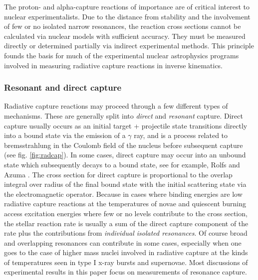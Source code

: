 The proton- and alpha-capture reactions of importance are of critical interest to nuclear experimentalists. Due to the distance from stability and the involvement of few or no isolated narrow resonances, the reaction cross sections cannot be calculated via nuclear models with sufficient accuracy. They must be measured directly or determined partially via indirect experimental methods. This principle founds the basis for much of the experimental nuclear astrophysics programs involved in measuring radiative capture reactions in inverse kinematics.   

\subsubsection{Resonant and direct capture}

Radiative capture reactions may proceed through a few different types of mechanisms. These are generally split into {\em direct} and {\em resonant} capture. Direct capture usually occurs as an initial target + projectile state transitions directly into a bound state via the emission of a $\gamma$ ray, and is a process related to bremsstrahlung in the Coulomb field of the nucleus before subsequent capture (see fig. \ref{fig:radcap}). In some cases, direct capture may occur into an unbound state which subsequently decays to a bound state, see for example, Rolfs and Azuma \cite{rolfs74}. The cross section for direct capture is proportional to the overlap integral over radius of the final bound state with the initial scattering state via the electromagnetic operator. Because in cases where binding energies are low radiative capture reactions at the temperatures of novae and quiescent burning access excitation energies where few or no levels contribute to the cross section, the stellar reaction rate is usually a sum of the direct capture component of the rate plus the contributions from  {\em individual isolated resonances}. Of course broad and overlapping resonances can contribute in some cases, especially when one goes to the case of higher mass nuclei involved in radiative capture at the kinds of temperatures seen in type I x-ray bursts and supernovae. Most discussions of experimental results in this paper focus on measurements of resonance capture. 

